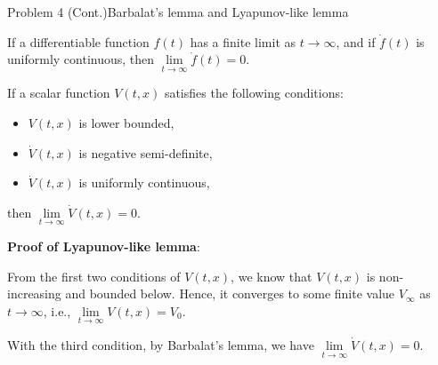 \documentclass[8pt]{beamer}
\begin{document}
\begin{frame}[t]{Problem 4 (Cont.)}{Barbalat's lemma and Lyapunov-like lemma}
  \begin{lemma}[Barbalat]
    \small If a differentiable function $f(t)$ has a finite limit as $t \to \infty$, and if $\dot f(t)$ is uniformly continuous, then $\lim\limits_{t \to \infty}\dot f(t)=0$.
  \end{lemma} 

  \begin{lemma}
    \small If a scalar function $V(t,x)$ satisfies the following conditions:
    \begin{itemize}
        \item $V(t,x)$ is lower bounded,
        \item $\dot V(t,x)$ is negative semi-definite,
        \item $\dot V(t,x)$ is uniformly continuous,
    \end{itemize}
    then $\lim\limits_{t\to{\infty}}\dot V(t,x)=0$.
  \end{lemma}

  \textbf{Proof of Lyapunov-like lemma}: 

  From the first two conditions of $V(t,x)$, we know that $V(t,x)$ is non-increasing and bounded below. Hence, it converges to some finite value $V_\infty$ as $t \to \infty$, i.e., $\lim\limits_{t\to\infty}V(t,x)=V_0$.

  With the third condition, by Barbalat's lemma, we have $\lim\limits_{t\to\infty}\dot V(t,x)=0$.
\end{frame}
\end{document}

